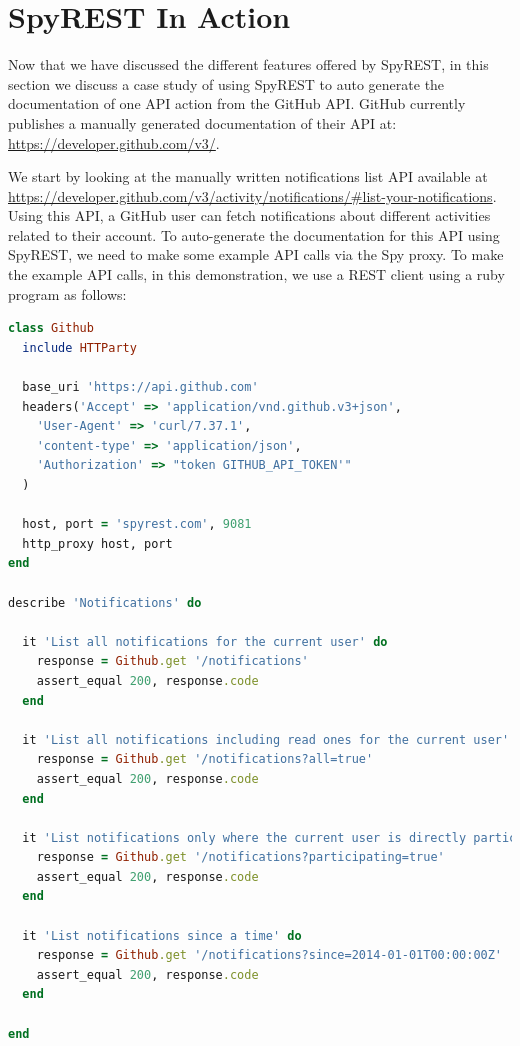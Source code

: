 \documentclass[conference]{IEEEtran}
\begin{document}
\section{SpyREST In Action}
Now that we have discussed the different features offered by SpyREST, in this section we discuss a case study of using SpyREST to auto generate the documentation of one API action from the GitHub API. GitHub currently publishes a manually generated documentation of their API at: \url{https://developer.github.com/v3/}.

We start by looking at the manually written notifications list API available at \url{https://developer.github.com/v3/activity/notifications/#list-your-notifications}. Using this API, a GitHub user can fetch notifications about different activities related to their account. To auto-generate the documentation for this API using SpyREST, we need to make some example API calls via the Spy proxy. To make the example API calls, in this demonstration, we use a REST client using a ruby program as follows:

\lstset{showstringspaces=false, basicstyle=\footnotesize, numbers=left, numbersep=1pt }
\begin{lstlisting}[language=ruby, breaklines=true, caption={}, label=list:ex]
class Github
  include HTTParty

  base_uri 'https://api.github.com'
  headers('Accept' => 'application/vnd.github.v3+json',
    'User-Agent' => 'curl/7.37.1',
    'content-type' => 'application/json',
    'Authorization' => "token GITHUB_API_TOKEN'"
  )

  host, port = 'spyrest.com', 9081
  http_proxy host, port
end

describe 'Notifications' do

  it 'List all notifications for the current user' do
    response = Github.get '/notifications'
    assert_equal 200, response.code
  end

  it 'List all notifications including read ones for the current user' do
    response = Github.get '/notifications?all=true'
    assert_equal 200, response.code
  end

  it 'List notifications only where the current user is directly participating or mentioned' do
    response = Github.get '/notifications?participating=true'
    assert_equal 200, response.code
  end

  it 'List notifications since a time' do
    response = Github.get '/notifications?since=2014-01-01T00:00:00Z'
    assert_equal 200, response.code
  end

end\end{lstlisting}
\end{document}
